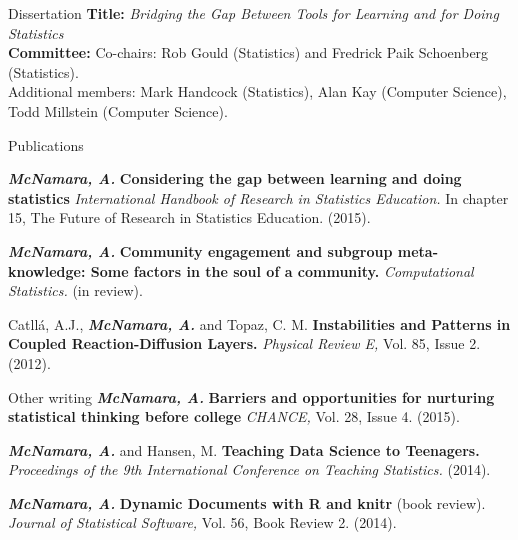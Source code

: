 \documentclass{resume} %
\begin{document}

\begin{rSection}{Dissertation}
{\bf Title:} {\em Bridging the Gap Between Tools for Learning and for Doing Statistics} 
\\{\bf Committee:} Co-chairs: Rob Gould (Statistics) and Fredrick Paik Schoenberg (Statistics).
\\ Additional members: Mark Handcock (Statistics), Alan Kay (Computer Science), Todd Millstein (Computer Science).
\end{rSection}


\clearpage

\begin{rSection}{Publications}


{\bf \em McNamara, A.} {\bf Considering the gap between learning and doing statistics} {\em International Handbook of Research in Statistics Education.} In chapter 15, The Future of Research in Statistics Education. {(2015).}

{\bf \em McNamara, A.} {\bf Community engagement and subgroup meta-knowledge: Some factors in the soul of a community.} { \em Computational Statistics.} (in review).





{Catll{\'a}, A.J., {\bf \em McNamara, A.} and Topaz, C. M.} {\bf Instabilities and Patterns in Coupled Reaction-Diffusion Layers.} {\em Physical Review E,} Vol. 85, Issue 2. (2012). 

\end{rSection}



\begin{rSection}{Other writing}
{\bf \em McNamara, A.} {\bf Barriers and opportunities for nurturing statistical thinking before college}{ \em CHANCE,} Vol. 28, Issue 4. (2015).

{\bf \em McNamara, A. }and Hansen, M. {\bf Teaching Data Science to Teenagers.}{ \em Proceedings of the 9th International Conference on Teaching Statistics.} (2014). 

{\bf \em McNamara, A. }{\bf Dynamic Documents with R and knitr} (book review). {\em Journal of Statistical Software,}{ Vol. 56, Book Review 2.} (2014).
\end{rSection}
\end{document}
